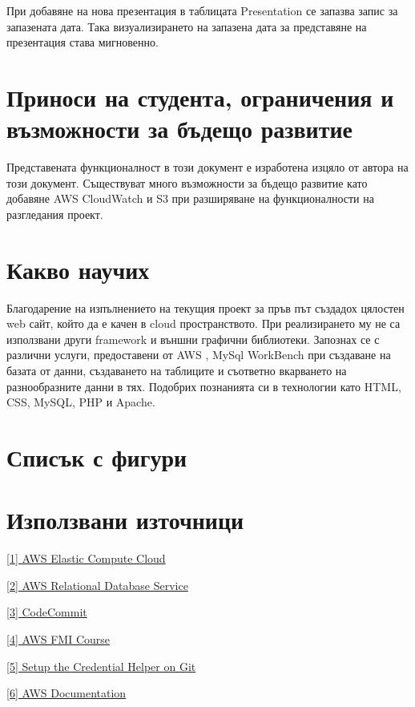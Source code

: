 \documentclass[12pt]{article}
\begin{document}
\noindent При добавяне на нова презентация в таблицата Presentation се запазва запис за запазената дата. Така визуализирането на запазена дата за представяне на презентация става мигновенно.

\medskip


\section{Приноси на студента, ограничения и възможности за бъдещо развитие}
\noindent Представената функционалност в този документ е изработена изцяло от автора на този документ. Съществуват много възможности за бъдещо развитие като добавяне AWS CloudWatch и S3 при разширяване на функционалности на разгледания проект. 
\medskip

\section{Какво научих}
\noindent Благодарение на изпълнението на текущия проект за пръв път създадох цялостен web сайт, който да е качен в cloud пространството. При реализирането му не са използвани други framework и външни графични библиотеки. Запознах се с различни услуги, предоставени от AWS , MySql WorkBench при създаване на базата от данни, създаването на таблиците и съответно вкарването на разнообразните данни в тях. Подобрих познанията си в технологии като HTML, CSS, MySQL, PHP и Apache.

\section{Списък с фигури}

\listoffigures

\section{Използвани източници}
\noindent\href{https://aws.amazon.com/ec2/}{[1] AWS Elastic Compute Cloud}

\noindent\href{https://aws.amazon.com/rds/}{[2] AWS Relational Database Service}

\noindent\href{https://aws.amazon.com/codecommit/}{[3] CodeCommit}

\noindent\href{https://learn.fmi.uni-sofia.bg/course/view.php?id=6143}{[4] AWS FMI Course}

\noindent\href{https://docs.aws.amazon.com/codecommit/latest/userguide/setting-up-https-unixes.html}{[5] Setup the Credential Helper on Git}

\noindent\href{https://docs.aws.amazon.com/index.html}{[6] AWS Documentation}
\end{document}
